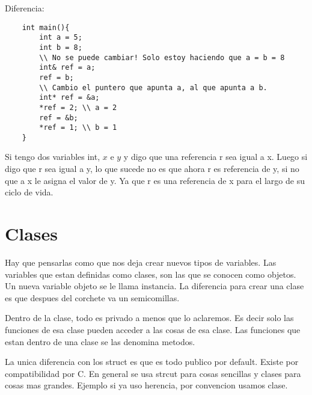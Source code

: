 \documentclass[11pt]{article}
\begin{document}
Diferencia:
\begin{lstlisting}
    int main(){
        int a = 5;
        int b = 8;
        \\ No se puede cambiar! Solo estoy haciendo que a = b = 8
        int& ref = a;
        ref = b;
        \\ Cambio el puntero que apunta a, al que apunta a b.
        int* ref = &a;
        *ref = 2; \\ a = 2
        ref = &b;
        *ref = 1; \\ b = 1
    }
\end{lstlisting}

Si tengo dos variables int, $x$ e $y$ y digo que una referencia r sea igual a x.
Luego si digo que r sea igual a y, lo que sucede no es que ahora r es referencia de
y, si no que a x le asigna el valor de y. Ya que r es una referencia de x para el
largo de su ciclo de vida.


\section{Clases}
Hay que pensarlas como que nos deja crear nuevos tipos de variables.
Las variables que estan definidas como clases, son las que se conocen como objetos.
Un nueva variable objeto se le llama instancia.
La diferencia para crear una clase es que despues del corchete va un semicomillas.

Dentro de la clase, todo es privado a menos que lo aclaremos.
Es decir solo las funciones de esa clase pueden acceder a las cosas de esa clase.
Las funciones que estan dentro de una clase se las denomina metodos.

La unica diferencia con los struct es que es todo publico por default.
Existe por compatibilidad por C.
En general se usa strcut para cosas sencillas y clases para cosas mas grandes.
Ejemplo si ya uso herencia, por convencion usamos clase.
\end{document}
